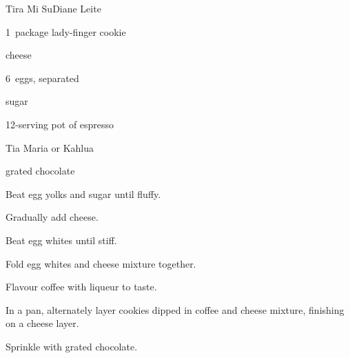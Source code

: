 \begin{recipe}{Tira Mi Su}{Diane Leite}{}

\begin{ingredients}
\item 1~package lady-finger cookie
\item {}  cheese
\item 6~eggs, separated
\item \C{\threequarter} sugar
\item 12-serving pot of espresso
\item Tia Maria or Kahlua
\item grated chocolate
\end{ingredients}

\begin{directions}
\item Beat egg yolks and sugar until fluffy.
\item Gradually add cheese.
\item Beat egg whites until stiff.
\item Fold egg whites and cheese mixture together.
\item Flavour coffee with liqueur to taste.
\item In a pan, alternately layer cookies dipped in coffee and cheese mixture, finishing on a cheese layer.
\item Sprinkle with grated chocolate.
\end{directions}

\end{recipe}
